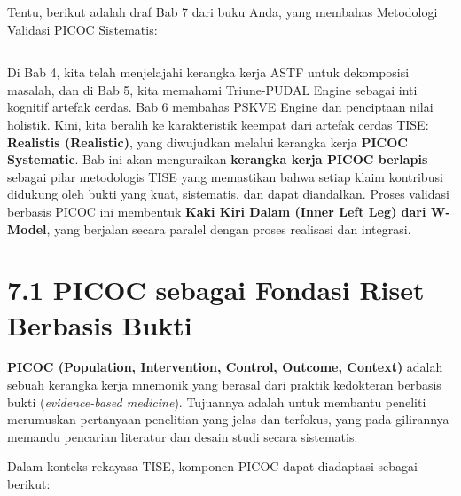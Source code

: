 \documentclass[
  letterpaper,
  DIV=11,
  numbers=noendperiod]{scrreprt}
\begin{document}
Tentu, berikut adalah draf Bab 7 dari buku Anda, yang membahas
Metodologi Validasi PICOC Sistematis:

\begin{center}\rule{0.5\linewidth}{0.5pt}\end{center}

Di Bab 4, kita telah menjelajahi kerangka kerja ASTF untuk dekomposisi
masalah, dan di Bab 5, kita memahami Triune-PUDAL Engine sebagai inti
kognitif artefak cerdas. Bab 6 membahas PSKVE Engine dan penciptaan
nilai holistik. Kini, kita beralih ke karakteristik keempat dari artefak
cerdas TISE: \textbf{Realistis (Realistic)}, yang diwujudkan melalui
kerangka kerja \textbf{PICOC Systematic}. Bab ini akan menguraikan
\textbf{kerangka kerja PICOC berlapis} sebagai pilar metodologis TISE
yang memastikan bahwa setiap klaim kontribusi didukung oleh bukti yang
kuat, sistematis, dan dapat diandalkan. Proses validasi berbasis PICOC
ini membentuk \textbf{Kaki Kiri Dalam (Inner Left Leg) dari W-Model},
yang berjalan secara paralel dengan proses realisasi dan integrasi.

\section{\texorpdfstring{\textbf{7.1 PICOC sebagai Fondasi Riset
Berbasis
Bukti}}{7.1 PICOC sebagai Fondasi Riset Berbasis Bukti}}\label{picoc-sebagai-fondasi-riset-berbasis-bukti}

\textbf{PICOC (Population, Intervention, Control, Outcome, Context)}
adalah sebuah kerangka kerja mnemonik yang berasal dari praktik
kedokteran berbasis bukti (\emph{evidence-based medicine}). Tujuannya
adalah untuk membantu peneliti merumuskan pertanyaan penelitian yang
jelas dan terfokus, yang pada gilirannya memandu pencarian literatur dan
desain studi secara sistematis.

Dalam konteks rekayasa TISE, komponen PICOC dapat diadaptasi sebagai
berikut:
\end{document}
